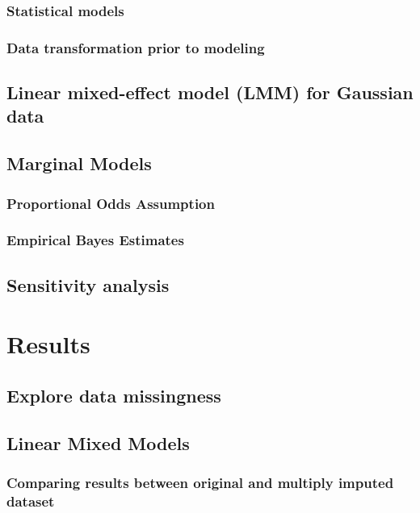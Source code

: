 \documentclass [11pt]{article}
\begin{document}
\subsubsection{Statistical models}
\subsubsection{Data transformation prior to modeling}


\subsection{Linear mixed-effect model (LMM) for Gaussian data}



\subsection{Marginal Models}


\subsubsection*{Proportional Odds Assumption}


\subsubsection*{Empirical Bayes Estimates}


\subsection{Sensitivity analysis}


\section{Results}
\subsection{Explore data missingness}


\subsection{Linear Mixed Models}


\subsubsection*{Comparing results between original and multiply imputed dataset}
\end{document}
